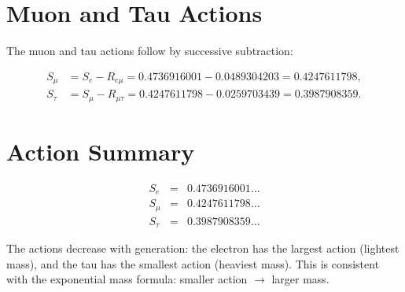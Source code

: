 \section{Muon and Tau Actions}

The muon and tau actions follow by successive subtraction:

\[
\begin{aligned}
S_\mu &= S_e - R_{e\mu}
      = 0.4736916001 - 0.0489304203
      = 0.4247611798, \\[4pt]
S_\tau &= S_\mu - R_{\mu\tau}
       = 0.4247611798 - 0.0259703439
       = 0.3987908359.
\end{aligned}
\]

\section{Action Summary}

\[
\begin{array}{lcl}
S_e &=& 0.4736916001 \ldots \\
S_\mu &=& 0.4247611798 \ldots \\
S_\tau &=& 0.3987908359 \ldots
\end{array}
\]

The actions decrease with generation: the electron has the largest action
(lightest mass), and the tau has the smallest action (heaviest mass).  This
is consistent with the exponential mass formula: smaller action \(\to\)
larger mass.
